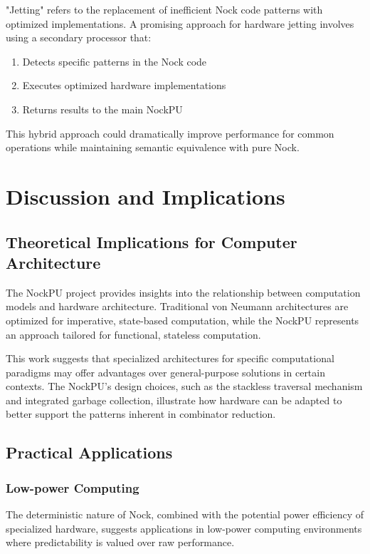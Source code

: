 \documentclass[twoside]{article}
\begin{document}
"Jetting" refers to the replacement of inefficient Nock code patterns with optimized implementations. A promising approach for hardware jetting involves using a secondary processor that:

\begin{enumerate}
  \item Detects specific patterns in the Nock code
  \item Executes optimized hardware implementations
  \item Returns results to the main NockPU
\end{enumerate}

\noindent
This hybrid approach could dramatically improve performance for common operations while maintaining semantic equivalence with pure Nock.

\section{Discussion and Implications}

\subsection{Theoretical Implications for Computer Architecture}

The NockPU project provides insights into the relationship between computation models and hardware architecture. Traditional von Neumann architectures are optimized for imperative, state-based computation, while the NockPU represents an approach tailored for functional, stateless computation.

This work suggests that specialized architectures for specific computational paradigms may offer advantages over general-purpose solutions in certain contexts. The NockPU's design choices, such as the stackless traversal mechanism and integrated garbage collection, illustrate how hardware can be adapted to better support the patterns inherent in combinator reduction.

\subsection{Practical Applications}

\subsubsection{Low-power Computing}

The deterministic nature of Nock, combined with the potential power efficiency of specialized hardware, suggests applications in low-power computing environments where predictability is valued over raw performance.
\end{document}
